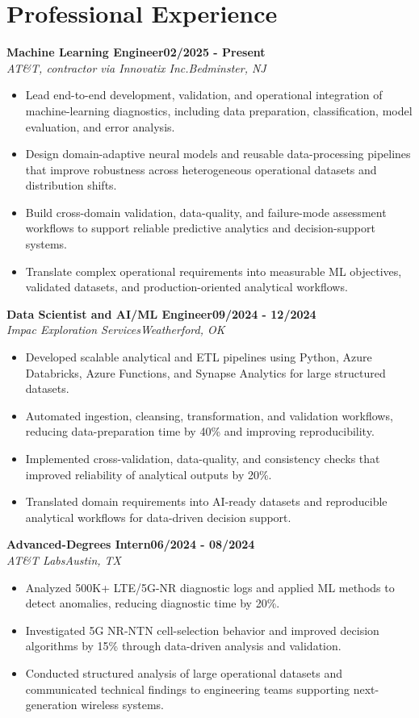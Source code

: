 \documentclass[9pt,letterpaper]{extarticle}
\newcommand{\role}[4]{%
  \Needspace{4\baselineskip}\textbf{#1}\hfill\textbf{#2}\\[-1pt]
  \textit{#3}\hfill\textit{#4}\par}
\begin{document}
\section{Professional Experience}
\role{Machine Learning Engineer}{02/2025 - Present}{AT\&T, contractor via Innovatix Inc.}{Bedminster, NJ}
\begin{itemize}
\item Lead end-to-end development, validation, and operational integration of machine-learning diagnostics, including data preparation, classification, model evaluation, and error analysis.
\item Design domain-adaptive neural models and reusable data-processing pipelines that improve robustness across heterogeneous operational datasets and distribution shifts.
\item Build cross-domain validation, data-quality, and failure-mode assessment workflows to support reliable predictive analytics and decision-support systems.
\item Translate complex operational requirements into measurable ML objectives, validated datasets, and production-oriented analytical workflows.
\end{itemize}
\role{Data Scientist and AI/ML Engineer}{09/2024 - 12/2024}{Impac Exploration Services}{Weatherford, OK}
\begin{itemize}
\item Developed scalable analytical and ETL pipelines using Python, Azure Databricks, Azure Functions, and Synapse Analytics for large structured datasets.
\item Automated ingestion, cleansing, transformation, and validation workflows, reducing data-preparation time by 40\% and improving reproducibility.
\item Implemented cross-validation, data-quality, and consistency checks that improved reliability of analytical outputs by 20\%.
\item Translated domain requirements into AI-ready datasets and reproducible analytical workflows for data-driven decision support.
\end{itemize}
\role{Advanced-Degrees Intern}{06/2024 - 08/2024}{AT\&T Labs}{Austin, TX}
\begin{itemize}
\item Analyzed 500K+ LTE/5G-NR diagnostic logs and applied ML methods to detect anomalies, reducing diagnostic time by 20\%.
\item Investigated 5G NR-NTN cell-selection behavior and improved decision algorithms by 15\% through data-driven analysis and validation.
\item Conducted structured analysis of large operational datasets and communicated technical findings to engineering teams supporting next-generation wireless systems.
\end{itemize}
\end{document}
